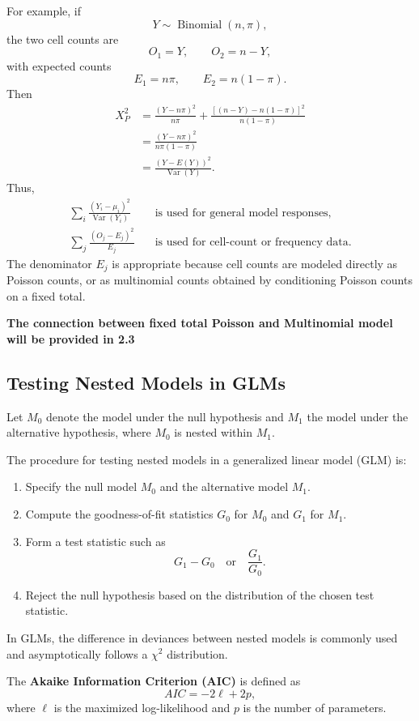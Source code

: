 \documentclass[11pt]{article}
\theoremstyle{definition}
\begin{document}
For example, if
\[
Y\sim\operatorname{Binomial}(n,\pi),
\]
the two cell counts are
\[
O_1=Y,
\qquad
O_2=n-Y,
\]
with expected counts
\[
E_1=n\pi,
\qquad
E_2=n(1-\pi).
\]
Then
\[
\begin{aligned}
X_P^2
&=
\frac{(Y-n\pi)^2}{n\pi}
+
\frac{\left[(n-Y)-n(1-\pi)\right]^2}{n(1-\pi)}
\\
&=
\frac{(Y-n\pi)^2}{n\pi(1-\pi)}
\\
&=
\frac{\left(Y-E(Y)\right)^2}{\operatorname{Var}(Y)}.
\end{aligned}
\]
Thus,
\[
\boxed{
\begin{aligned}
\sum_i\frac{(Y_i-\mu_i)^2}{\operatorname{Var}(Y_i)}
&\quad\text{is used for general model responses,}\\
\sum_j\frac{(O_j-E_j)^2}{E_j}
&\quad\text{is used for cell-count or frequency data.}
\end{aligned}
}
\]
The denominator \(E_j\) is appropriate because cell counts are modeled directly
as Poisson counts, or as multinomial counts obtained by conditioning Poisson
counts on a fixed total.

\textbf{The connection between fixed total Poisson and Multinomial model will be provided in 2.3}
\subsection{Testing Nested Models in GLMs}
Let $M_0$ denote the model under the null hypothesis and $M_1$ the model under the alternative hypothesis, where $M_0$ is nested within $M_1$.

The procedure for testing nested models in a generalized linear model (GLM) is:
\begin{enumerate}
    \item Specify the null model $M_0$ and the alternative model $M_1$.
    \item Compute the goodness-of-fit statistics $G_0$ for $M_0$ and $G_1$ for $M_1$.
    \item Form a test statistic such as
    \[
    G_1 - G_0
    \quad \text{or} \quad
    \frac{G_1}{G_0}.
    \]
    \item Reject the null hypothesis based on the distribution of the chosen test statistic.
\end{enumerate}
In GLMs, the difference in deviances between nested models is commonly used and asymptotically follows a $\chi^2$ distribution.

The \textbf{Akaike Information Criterion (AIC)} is defined as
\[
AIC = -2\ell + 2p,
\]
where $\ell$ is the maximized log-likelihood and $p$ is the number of parameters.
\end{document}
